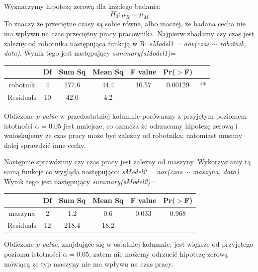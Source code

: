 \documentclass{article}
\begin{document}
Wyznaczymy hipotezę zerową dla każdego badania:
\[ H_0 : \mu_R = \mu_M \]
To znaczy że przeciętne czasy są sobie równe, albo inaczej, że badana cecha nie ma wpływu na czas przeciętny pracy pracownika. Najpierw zbadamy czy czas jest zależny od robotnika następująca funkcją w R: \textit{sModel1 = aov(czas $\sim$ robotnik, data)}. Wynik tego jest następujący \textit{summary(sModel1)}=
\begin{center} \begin{tabular}{|c|c|c|c|c|c|c|} \hline
& Df & Sum Sq & Mean Sq & F value & Pr($>$F) & \\ \hline
robotnik & 4 & 177.6 & 44.4 & 10.57 & 0.00129 & ** \\ \hline
Residuals & 10 & 42.0 & 4.2 & & & \\ \hline
\end{tabular} \end{center}
Obliczone \textit{p-value} w przedostatniej kolumnie porównany z przyjętym poziomem istotności $\alpha = 0.05$ jest mniejsze, co oznacza że odrzucamy hipotezę zerową i wnioskujemy że czas pracy może być zależny od robotnika; natomiast musimy dalej sprawdzić inne cechy. \\ \par

Następnie sprawdzimy czy czas pracy jest zależny od maszyny. Wykorzystamy tą samą funkcje co wygląda następująco: \textit{sModel2 = aov(czas $\sim$ maszyna, data)}. Wynik tego jest następujący \textit{summary(sModel2)}=
\begin{center} \begin{tabular}{|c|c|c|c|c|c|} \hline
& Df & Sum Sq & Mean Sq & F value & Pr($>$F) \\ \hline
maszyna & 2 & 1.2 & 0.6 & 0.033 & 0.968 \\ \hline
Residuals & 12 & 218.4 & 18.2 & & \\ \hline
\end{tabular} \end{center}
Obliczone \textit{p-value}, znajdujące się w ostatniej kolumnie, jest większe od przyjętego poziomu istotności $\alpha = 0.05$; zatem nie możemy odrzucić hipotezę zerową mówiącą ze typ maszyny nie ma wpływu na czas pracy. \\
\end{document}
